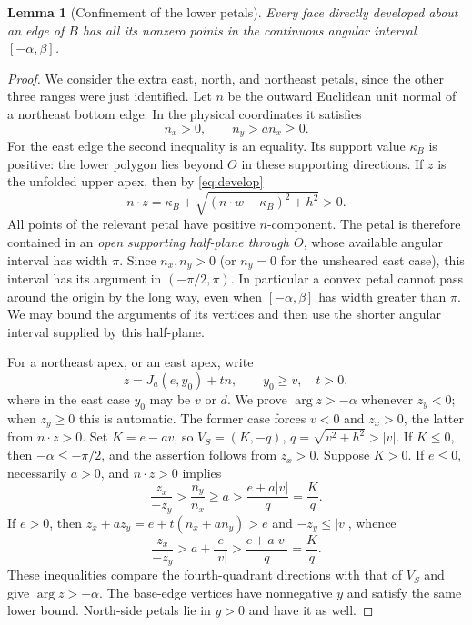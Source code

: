 \documentclass[a4paper,11pt]{amsart}
\newtheorem{lemma}[theorem]{Lemma}
\newcommand{\ang}{\operatorname{arg}}
\begin{document}
\begin{lemma}[Confinement of the lower petals]\label{lem:directions}
Every face directly developed about an edge of $B$ has all its nonzero points in the continuous angular interval $[-\alpha,\beta]$.
\end{lemma}
\begin{proof}
We consider the extra east, north, and northeast petals, since the other three ranges were just identified. Let $n$ be the outward Euclidean unit normal of a northeast bottom edge. In the physical coordinates it satisfies
\begin{equation}\label{eq:normal}
 n_x>0,\qquad n_y>a n_x\geq0.
\end{equation}
For the east edge the second inequality is an equality. Its support value $\kappa_B$ is positive: the lower polygon lies beyond $O$ in these supporting directions. If $z$ is the unfolded upper apex, then by \eqref{eq:develop}
\[
 n\cdot z=\kappa_B+\sqrt{(n\cdot w-\kappa_B)^2+h^2}>0.
\]
All points of the relevant petal have positive $n$-component. The petal is therefore contained in an \emph{open supporting half-plane through $O$}, whose available angular interval has width $\pi$. Since $n_x,n_y>0$ (or $n_y=0$ for the unsheared east case), this interval has its argument in $(-\pi/2,\pi)$. In particular a convex petal cannot pass around the origin by the long way, even when $[-\alpha,\beta]$ has width greater than $\pi$. We may bound the arguments of its vertices and then use the shorter angular interval supplied by this half-plane.

For a northeast apex, or an east apex, write
\begin{equation}\label{eq:apexparam}
 z=J_a(e,y_0)+t n,\qquad y_0\geq v,\quad t>0,
\end{equation}
where in the east case $y_0$ may be $v$ or $d$. We prove $\ang z>-\alpha$ whenever $z_y<0$; when $z_y\geq0$ this is automatic. The former case forces $v<0$ and $z_x>0$, the latter from $n\cdot z>0$. Set $K=e-av$, so $V_S=(K,-q)$, $q=\sqrt{v^2+h^2}>|v|$. If $K\leq0$, then $-\alpha\leq-\pi/2$, and the assertion follows from $z_x>0$. Suppose $K>0$. If $e\leq0$, necessarily $a>0$, and $n\cdot z>0$ implies
\[
 \frac{z_x}{-z_y}>\frac{n_y}{n_x}\geq a>
 \frac{e+a|v|}{q}=\frac Kq.
\]
If $e>0$, then $z_x+az_y=e+t(n_x+an_y)>e$ and $-z_y\leq|v|$, whence
\[
 \frac{z_x}{-z_y}>a+\frac{e}{|v|}>
 \frac{e+a|v|}{q}=\frac Kq.
\]
These inequalities compare the fourth-quadrant directions with that of $V_S$ and give $\ang z>-\alpha$. The base-edge vertices have nonnegative $y$ and satisfy the same lower bound. North-side petals lie in $y>0$ and have it as well.


\end{proof}
\end{document}
